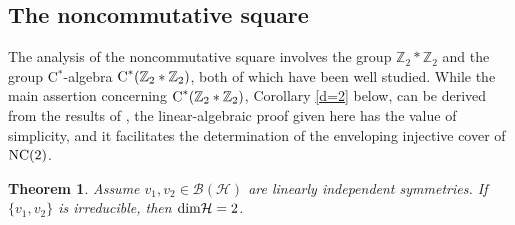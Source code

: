 \documentclass{amsart}
\newtheorem{theorem}{Theorem}[section]
\theoremstyle{definition}
\theoremstyle{remark}
\newcommand{\B}{\mathcal{B}}
\renewcommand{\H}{\mathcal{H}}
\newcommand\cstar{{\textrm C}^*}                              %
\numberwithin{equation}{section}
\begin{document}
\subsection{The noncommutative square}

The analysis of the noncommutative square involves the group $\mathbb Z_2 * \mathbb Z_2$ and the group
C$^*$-algebra $\cstar(\mathbb Z_2 * \mathbb Z_2)$, both of which have been well studied. 
While the main assertion concerning $\cstar(\mathbb Z_2 * \mathbb Z_2)$, Corollary \ref{d=2} below, can be derived from the results of \cite{raeburn--sinclair1989},
the linear-algebraic proof given here has the value of simplicity, and it facilitates the determination of the enveloping injective cover of $\mbox{\textrm{NC}}(2)$.

\begin{theorem}\label{thm d=2}
Assume $v_1,v_2\in\B(\H)$ are linearly independent symmetries.  
	If $\{v_1,v_2\}$ is irreducible, then $\mbox{\textrm dim}\H=2$.
\end{theorem}
\end{document}
